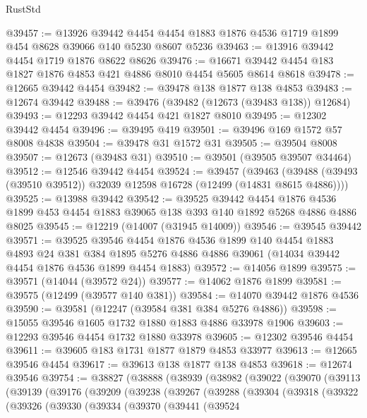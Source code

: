 \begin{lexlean}{RustStd}
\begin{coremodule}
{\begin{coremodule}
{{{{{{{{{{{{{{{{{{{{{{{{{{{{{{{{{{{{{{{{{{{{{{{{{{{{{{{{{{{{{{{{{{{{{{{{{{{{{{{{@39457 := @13926
    @39442
    @4454
    @4454
    @1883
    @1876
    @4536
    @1719
    @1899
    @454
    @8628
    @39066
    @140
    @5230
    @8607
    @5236
@39463 := @13916 @39442 @4454 @1719 @1876 @8622 @8626
@39476 := @16671 @39442 @4454 @183 @1827 @1876 @4853 @421 @4886 @8010 @4454 @5605 @8614 @8618
@39478 := @12665 @39442 @4454
@39482 := @39478 @138 @1877 @138 @4853
@39483 := @12674 @39442
@39488 := @39476 (@39482 (@12673 (@39483 @138)) @12684)
@39493 := @12293 @39442 @4454 @421 @1827 @8010
@39495 := @12302 @39442 @4454
@39496 := @39495 @419
@39501 := @39496 @169 @1572 @57 @8008 @4838
@39504 := @39478 @31 @1572 @31
@39505 := @39504 @8008
@39507 := @12673 (@39483 @31)
@39510 := @39501 (@39505 @39507 @34464)
@39512 := @12546 @39442 @4454
@39524 := @39457
    (@39463 (@39488 (@39493 (@39510 @39512)) @32039 @12598 @16728 (@12499 (@14831 @8615 @4886))))
@39525 := @13988 @39442
@39542 := @39525
    @39442
    @4454
    @1876
    @4536
    @1899
    @453
    @4454
    @1883
    @39065
    @138
    @393
    @140
    @1892
    @5268
    @4886
    @4886
    @8025
@39545 := @12219 (@14007 (@31945 @14009))
@39546 := @39545 @39442
@39571 := @39525
    @39546
    @4454
    @1876
    @4536
    @1899
    @140
    @4454
    @1883
    @4893
    @24
    @381
    @384
    @1895
    @5276
    @4886
    @4886
    @39061
    (@14034 @39442 @4454 @1876 @4536 @1899 @4454 @1883)
@39572 := @14056 @1899
@39575 := @39571 (@14044 (@39572 @24))
@39577 := @14062 @1876 @1899
@39581 := @39575 (@12499 (@39577 @140 @381))
@39584 := @14070 @39442 @1876 @4536
@39590 := @39581 (@12247 (@39584 @381 @384 @5276 @4886))
@39598 := @15055 @39546 @1605 @1732 @1880 @1883 @4886 @33978 @1906
@39603 := @12293 @39546 @4454 @1732 @1880 @33978
@39605 := @12302 @39546 @4454
@39611 := @39605 @183 @1731 @1877 @1879 @4853 @33977
@39613 := @12665 @39546 @4454
@39617 := @39613 @138 @1877 @138 @4853
@39618 := @12674 @39546
@39754 := @38827
    (@38888
      (@38939
        (@38982
          (@39022
            (@39070
              (@39113
                (@39139
                  (@39176
                    (@39209
                      (@39238
                        (@39267
                          (@39288
                            (@39304
                              (@39318
                                (@39322
                                  (@39326
                                    (@39330
                                      (@39334
                                        (@39370
                                          (@39441
                                            (@39524
}}}}}}}}}}}}}}}}}}}}}}}}}}}}}}}}}}}}}}}}}}}}}}}}}}}}}}}}}}}}}}}}}}}}}}}}}}}}}}}}
\end{coremodule}}
\end{coremodule}
\end{lexlean}
